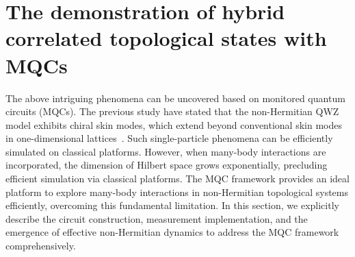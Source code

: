 \documentclass[longbibliography, aps, prx, amsmath, amssymb, amsfonts, twocolumn,superscriptaddress, footinbib]{revtex4-1}
\begin{document}
    
\section{The demonstration of hybrid correlated topological states with MQCs}
	\label{sec:MQC_demo}
	
	{The above intriguing phenomena can be uncovered based on 
monitored quantum circuits (MQCs). The previous study have stated that 
the non-Hermitian QWZ model exhibits chiral skin modes, which extend beyond 
conventional skin modes in one-dimensional lattices~\cite{nakamura2023universal, 
ma2024non,schindler2023hermitian}. Such single-particle phenomena can be 
efficiently simulated on classical platforms. However, when 
many-body interactions are incorporated, the dimension of Hilbert space grows 
exponentially, precluding efficient simulation via classical platforms.
The MQC framework provides an ideal platform to explore many-body 
interactions in non-Hermitian topological systems efficiently, overcoming 
this fundamental limitation. In this section, we explicitly describe the circuit 
construction, measurement implementation, and the emergence of effective 
non-Hermitian dynamics to address the MQC framework comprehensively.}
\end{document}

